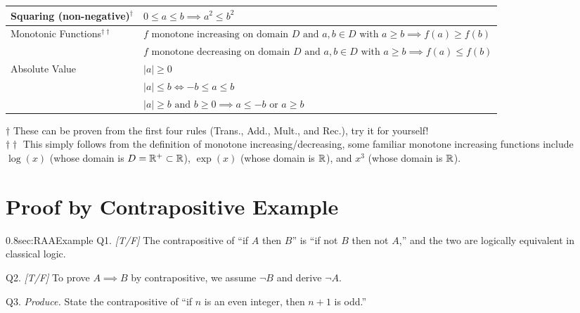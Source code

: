 \begin{center}
\begin{tabular}{|p{3.5cm}|p{11.1cm}|}
\hline
Squaring (non-negative)$^\dagger$ &
$ 0 \leq a \leq b \implies a^2 \leq b^2 $ \\
\hline
Monotonic Functions$^{\dagger\dagger}$ &
$ f \text{ monotone increasing on domain } D \text{ and } a,b \in D \text{ with } a \geq b \implies f(a) \geq f(b) $ \\
& $ f \text{ monotone decreasing on domain } D \text{ and } a,b \in D \text{ with } a \geq b \implies f(a) \leq f(b) $ \\
\hline
Absolute Value &
$ |a| \geq 0 $ \\
& $ |a| \leq b \iff -b \leq a \leq b $ \\
& $ |a| \geq b \text{ and } b \geq 0 \implies a \leq -b \text{ or } a \geq b $ \\
\hline
\end{tabular}
\end{center}
\vspace{-0.1in}
$\dagger$ These can be proven from the first four rules (Trans., Add., Mult., and Rec.), try it for yourself! \\
$\dagger\dagger$ This simply follows from the definition of monotone increasing/decreasing, some familiar monotone increasing functions include $\log(x)$ (whose domain is $D={\mathbb{R}}^+ \subset {\mathbb{R}}$), $\exp(x)$ (whose domain is ${\mathbb{R}}$), and $x^3$ (whose domain is ${\mathbb{R}}$).

\newpage

\section{Proof by Contrapositive Example}
\label{sec:ContrapositiveExample}

\begin{selfcheckbox}{0.8}{sec:RAAExample}
  \hypertarget{q:ch0:contrapos}{}
  Q1. \textit{[T/F]} The contrapositive of ``if $A$ then $B$'' is ``if not $B$ then not $A$,'' and the two are logically equivalent in classical logic.\par\smallskip
  Q2. \textit{[T/F]} To prove $A \implies B$ by contrapositive, we assume $\lnot B$ and derive $\lnot A$.\par\smallskip
  Q3. \textit{Produce.} State the contrapositive of ``if $n$ is an even integer, then $n + 1$ is odd.''
  \par\medskip\hfill{}
\end{selfcheckbox}


